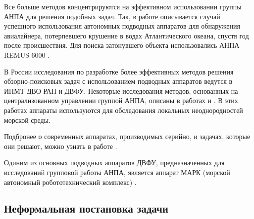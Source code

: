 \documentclass[a4paper,14pt,russian]{article}
\begin{document}
Все больше методов концентрируются на эффективном использовании группы АНПА для решения подобных задач.
Так, в работе \cite{purcell2011use} описывается случай успешного использования автономных подводных аппаратов для обнаружения авиалайнера, потерпевшего крушение в водах Атлантического океана, спустя год после происшествия. Для поиска затонувшего объекта использовались АНПА REMUS 6000 \cite{sharp2008more}.

В России исследования по разработке более эффективных методов решения обзорно-поисковых задач с использованием подводных аппаратов ведутся в ИПМТ ДВО РАН и ДВФУ. Некоторые исследования методов, основанных на централизованном управлении группой АНПА, описаны в работах \cite{tuphanov1} и \cite{tuphanov2}. В этих работах аппараты используются для обследования локальных неоднородностей морской среды.

Подбронее о современных аппаратах, производимых серийно, и задачах, которые они решают, можно узнать в работе \cite{auvs}.

Одиним из основных подводных аппаратов ДВФУ, предназначенных для исследований групповой работы АНПА, является аппарат МАРК (морской автономный робототехнический комплекс) \cite{marc}.

\subsection{Неформальная постановка задачи}

\end{document}
